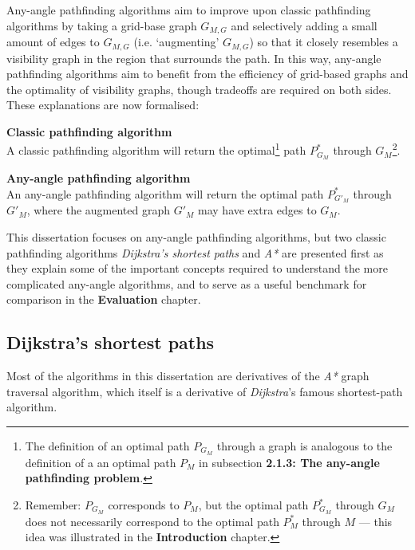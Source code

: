 \documentclass[12pt,notitlepage]{report}
\begin{document}
\noindent
Any-angle pathfinding algorithms aim to improve upon classic pathfinding algorithms by taking a grid-base graph $G_{M,G}$ and selectively adding a small amount of edges to $G_{M,G}$ (i.e. `augmenting' $G_{M,G}$) so that it closely resembles a visibility graph in the region that surrounds the path. In this way, any-angle pathfinding algorithms aim to benefit from the efficiency of grid-based graphs and the optimality of visibility graphs, though tradeoffs are required on both sides. These explanations are now formalised:

\begin{description}
\item{\bfseries Classic pathfinding algorithm}\\ 
A classic pathfinding algorithm will return the optimal\footnote{The definition of an optimal path $P_{G_{M}}$ through a graph is analogous to the definition of a an optimal path $P_{M}$ in subsection {\bfseries 2.1.3: The any-angle pathfinding problem}.}  path $P^{*}_{G_{M}}$ through $G_{M}$\footnote{Remember: $P_{G_{M}}$ corresponds to $P_{M}$, but the optimal path $P^{*}_{G_{M}}$ through $G_{M}$ does not necessarily correspond to the optimal path $P^{*}_{M}$ through $M$ --- this idea was illustrated in the {\bfseries Introduction} chapter.}.
\item{\bfseries Any-angle pathfinding algorithm}\\
An any-angle pathfinding algorithm will return the optimal path $P^{*}_{G'_{M}}$ through $G'_{M}$, where the augmented graph $G'_{M}$ may have extra edges to $G_{M}$.
\end{description}

\noindent
This dissertation focuses on any-angle pathfinding algorithms, but two classic pathfinding algorithms {\em Dijkstra's shortest paths} and {\em A*} are presented first as they explain some of the important concepts required to understand the more complicated any-angle algorithms, and to serve as a useful benchmark for comparison in the {\bfseries Evaluation} chapter.

\subsection {Dijkstra's shortest paths}

Most of the algorithms in this dissertation are derivatives of the {\em A*} graph traversal algorithm, which itself is a derivative of {\em Dijkstra}'s famous shortest-path algorithm.\\
\end{document}
